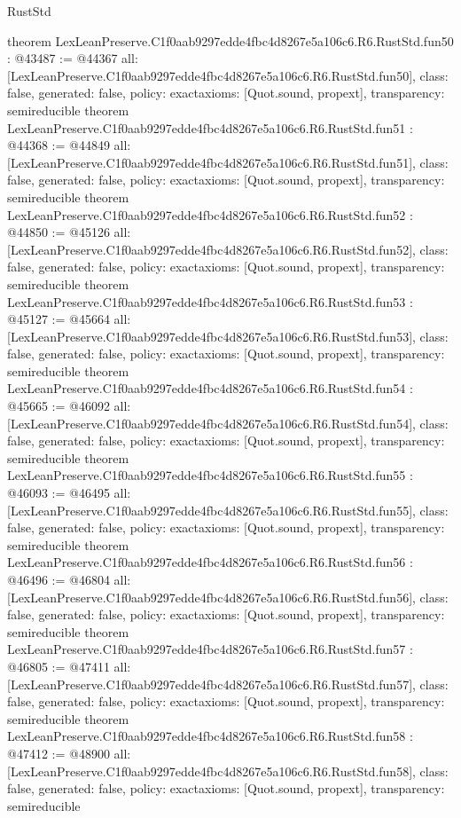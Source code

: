 \begin{lexlean}{RustStd}
\begin{coremodule}
{}
theorem LexLeanPreserve.C1f0aab9297edde4fbc4d8267e5a106c6.R6.RustStd.fun50 : @43487 := @44367 {
  all: [LexLeanPreserve.C1f0aab9297edde4fbc4d8267e5a106c6.R6.RustStd.fun50],
  class: false,
  generated: false,
  policy: exact{axioms: [Quot.sound, propext]},
  transparency: semireducible
}
theorem LexLeanPreserve.C1f0aab9297edde4fbc4d8267e5a106c6.R6.RustStd.fun51 : @44368 := @44849 {
  all: [LexLeanPreserve.C1f0aab9297edde4fbc4d8267e5a106c6.R6.RustStd.fun51],
  class: false,
  generated: false,
  policy: exact{axioms: [Quot.sound, propext]},
  transparency: semireducible
}
theorem LexLeanPreserve.C1f0aab9297edde4fbc4d8267e5a106c6.R6.RustStd.fun52 : @44850 := @45126 {
  all: [LexLeanPreserve.C1f0aab9297edde4fbc4d8267e5a106c6.R6.RustStd.fun52],
  class: false,
  generated: false,
  policy: exact{axioms: [Quot.sound, propext]},
  transparency: semireducible
}
theorem LexLeanPreserve.C1f0aab9297edde4fbc4d8267e5a106c6.R6.RustStd.fun53 : @45127 := @45664 {
  all: [LexLeanPreserve.C1f0aab9297edde4fbc4d8267e5a106c6.R6.RustStd.fun53],
  class: false,
  generated: false,
  policy: exact{axioms: [Quot.sound, propext]},
  transparency: semireducible
}
theorem LexLeanPreserve.C1f0aab9297edde4fbc4d8267e5a106c6.R6.RustStd.fun54 : @45665 := @46092 {
  all: [LexLeanPreserve.C1f0aab9297edde4fbc4d8267e5a106c6.R6.RustStd.fun54],
  class: false,
  generated: false,
  policy: exact{axioms: [Quot.sound, propext]},
  transparency: semireducible
}
theorem LexLeanPreserve.C1f0aab9297edde4fbc4d8267e5a106c6.R6.RustStd.fun55 : @46093 := @46495 {
  all: [LexLeanPreserve.C1f0aab9297edde4fbc4d8267e5a106c6.R6.RustStd.fun55],
  class: false,
  generated: false,
  policy: exact{axioms: [Quot.sound, propext]},
  transparency: semireducible
}
theorem LexLeanPreserve.C1f0aab9297edde4fbc4d8267e5a106c6.R6.RustStd.fun56 : @46496 := @46804 {
  all: [LexLeanPreserve.C1f0aab9297edde4fbc4d8267e5a106c6.R6.RustStd.fun56],
  class: false,
  generated: false,
  policy: exact{axioms: [Quot.sound, propext]},
  transparency: semireducible
}
theorem LexLeanPreserve.C1f0aab9297edde4fbc4d8267e5a106c6.R6.RustStd.fun57 : @46805 := @47411 {
  all: [LexLeanPreserve.C1f0aab9297edde4fbc4d8267e5a106c6.R6.RustStd.fun57],
  class: false,
  generated: false,
  policy: exact{axioms: [Quot.sound, propext]},
  transparency: semireducible
}
theorem LexLeanPreserve.C1f0aab9297edde4fbc4d8267e5a106c6.R6.RustStd.fun58 : @47412 := @48900 {
  all: [LexLeanPreserve.C1f0aab9297edde4fbc4d8267e5a106c6.R6.RustStd.fun58],
  class: false,
  generated: false,
  policy: exact{axioms: [Quot.sound, propext]},
  transparency: semireducible
}
\end{coremodule}
\end{lexlean}
